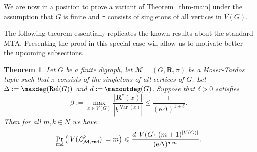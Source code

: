 \documentclass[12pt,a4paper]{article}
\numberwithin{equation}{section}
\newtheorem{theorem}[equation]{Theorem} %
\theoremstyle{definition}
\newcommand{\be}{{\beta}}
\newcommand{\De}{{\Delta}}
\renewcommand{\le}{\leqslant}
\renewcommand{\cal}[1]{{\mathcal #1}}
\newcommand\Rel{\operatorname{Rel}}
\newcommand\Var{\operatorname{Var}}
\newcommand{\me}{\mathrm{e}}
\begin{document}
    We are now in a position to prove a variant of Theorem~\ref{thm-main} under the assumption that $G$ is finite and  $\pi$ consists of singletons of all vertices in $V(G)$.
    
    The following theorem essentially replicates the known results about the standard MTA. Presenting the proof in this special case will allow us to motivate better the upcoming subsections.
    
    \begin{theorem}\label{thm-main-classic}
    Let $G$ be a finite digraph, let $\cal M = (G, \mathbf R,  \pi)$ be a Moser-Tardos tuple such that $\pi$ consists of the singletons of all vertices of $G$.  Let $\De :=\maxdeg(\Rel(G))$ and $d:=\maxoutdeg(G)$. Suppose that $\delta>0$ satisfies
    \begin{equation}\label{eq:delta}
        \be := \max_{x\in V(G)} \frac{|\mathbf R^c(x)|}{|b^{\Var(x)}|} \le  \frac{1}{(\me\De)^{1+\delta}}.
    \end{equation}
    Then for all $m,k\in N$ we have  
    \begin{equation}\label{eq-wqeq35}
        \Pr_{\rnd}\left(|V(\cal L^k_{\cal M, \rnd})| = m\right) \le \frac{ d\,|V(G)|\,(m+1)^{|V(G)|}}{(\me\De)^{\delta\cdot m}}.
    \end{equation}
    \end{theorem}
    
\end{document}
